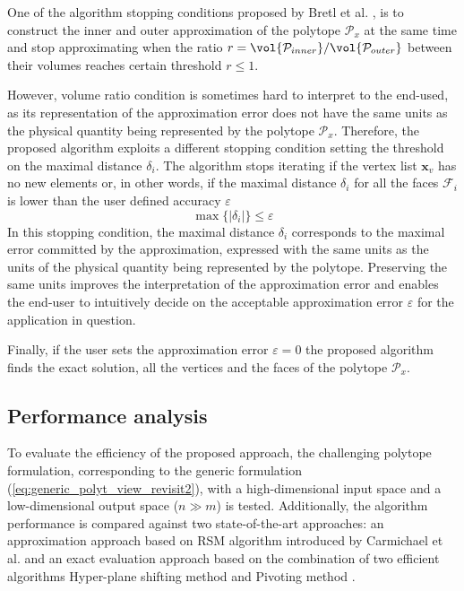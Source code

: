 One of the algorithm stopping conditions proposed by Bretl et al. \cite{Bretl2008}, is to construct the inner and outer approximation of the polytope $\mathcal{P}_x$ at the same time and stop approximating when the ratio $r=\vol{\mathcal{P}_{inner}}/\vol{\mathcal{P}_{outer}}$ between their volumes reaches certain threshold $r\leq1$.  

However, volume ratio condition is sometimes hard to interpret to the end-used, as its representation of the approximation error does not have the same units as the physical quantity being represented by the polytope $\mathcal{P}_x$. Therefore, the proposed algorithm exploits a different stopping condition setting the threshold on the maximal distance $\delta_i$. The algorithm stops iterating if the vertex list $\bm{x}_v$ has no new elements or, in other words, if the maximal distance $\delta_i$ for all the faces $\mathcal{F}_i$ is lower than the user defined accuracy $\varepsilon$  
\begin{equation}
    \max\{|\delta_{i}|\} \leq \varepsilon
\end{equation}
In this stopping condition, the maximal distance $\delta_i$ corresponds to the maximal error committed by the approximation, expressed with the same units as the units of the physical quantity being represented by the polytope. Preserving the same units improves the interpretation of the approximation error and enables the end-user to intuitively decide on the acceptable approximation error $\varepsilon$ for the application in question. 

Finally, if the user sets the approximation error $\varepsilon\!=\!0$ the proposed algorithm finds the exact solution, all the vertices and the faces of the polytope $\mathcal{P}_x$.

\subsection{Performance analysis}
\label{ch:chm_performance}

To evaluate the efficiency of the proposed approach, the challenging polytope formulation, corresponding to the generic formulation (\ref{eq:generic_polyt_view_revisit2}), with a high-dimensional input space and a low-dimensional output space ($n\gg m$) is tested. Additionally, the algorithm performance is compared against two state-of-the-art approaches: an approximation approach based on RSM algorithm introduced by Carmichael et al. \cite{carmichael_towards_2011} and an exact evaluation approach based on the combination of two efficient algorithms Hyper-plane shifting method \cite{hyper_psm} and Pivoting method \cite{bremner_fukuda_marzetta_1998}.

